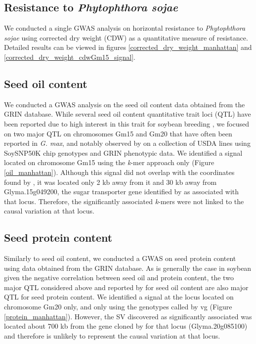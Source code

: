 \subsection*{Resistance to \emph{Phytophthora sojae}}
\label{sv-gwas-resistance}

We conducted a single GWAS analysis on horizontal resistance to
\textit{Phytophthora sojae} using corrected dry weight (CDW) as a quantitative
measure of resistance. Detailed results can be viewed in figures
\ref{corrected_dry_weight_manhattan} and
\ref{corrected_dry_weight_cdwGm15_signal}.

\subsection*{Seed oil content}
\label{sv-gwas-seed-oil-content}

We conducted a GWAS analysis on the seed oil content data obtained from the
GRIN database. While several seed oil content quantitative trait loci (QTL)
have been reported due to high interest in this trait for soybean breeding
\citep{chaudhary2015}, we focused on two major QTL on chromosomes Gm15 and Gm20
that have often been reported in \emph{G. max}, and notably observed by
\cite{bandillo2015} on a collection of USDA lines using SoySNP50K chip
genotypes and GRIN phenotypic data. We identified a signal located on
chromosome Gm15 using the \emph{k}-mer approach only (Figure
\ref{oil_manhattan}). Although this signal did not overlap with the coordinates
found by \cite{bandillo2017}, it was located only 2 kb away from it and 30 kb
away from Glyma.15g049200, the sugar transporter gene identified by
\cite{zhang2020} as associated with that locus. Therefore, the significantly
associated \emph{k}-mers were not linked to the causal variation at that locus.

\subsection*{Seed protein content}
\label{sv-gwas-seed-protein-content}

Similarly to seed oil content, we conducted a GWAS on seed protein content
using data obtained from the GRIN database. As is generally the case in
soybean given the negative correlation between seed oil and protein content,
the two major QTL considered above and reported by \cite{bandillo2015} for seed
oil content are also major QTL for seed protein content. We identified a signal
at the locus located on chromosome Gm20 only, and only using the genotypes
called by vg (Figure \ref{protein_manhattan}). However, the SV discovered as
significantly associated was located about 700 kb from the gene cloned by
\cite{fliege2022} for that locus (Glyma.20g085100) and therefore is unlikely to
represent the causal variation at that locus.

